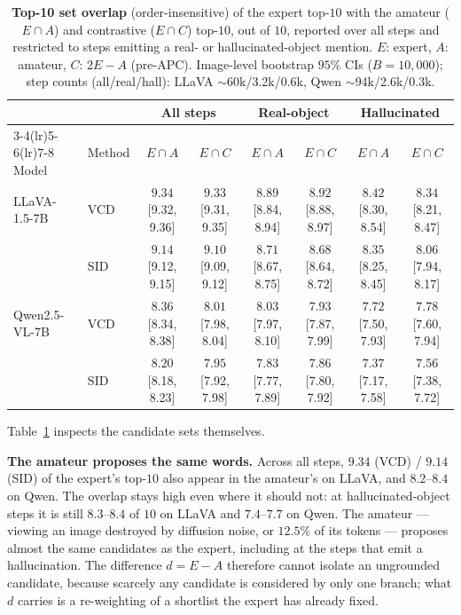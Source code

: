 \begin{table}[t]
\centering
\small
\setlength{\tabcolsep}{1.5pt}
\caption{\textbf{Top-10 set overlap} (order-insensitive) of the expert top-$10$
with the amateur ($E\!\cap\!A$) and contrastive ($E\!\cap\!C$) top-$10$, out of
$10$, reported over all steps and restricted to steps emitting a real- or
hallucinated-object mention. $E$: expert, $A$: amateur, $C$: $2E-A$ (pre-APC).
Image-level bootstrap $95\%$ CIs ($B=10{,}000$); step counts (all/real/hall):
LLaVA $\sim$60k/3.2k/0.6k, Qwen $\sim$94k/2.6k/0.3k.}
\label{tab:cdmech-overlap}
\begin{tabular}{llcccccc}
\toprule
& & \multicolumn{2}{c}{All steps} & \multicolumn{2}{c}{Real-object} & \multicolumn{2}{c}{Hallucinated} \\
\cmidrule(lr){3-4}\cmidrule(lr){5-6}\cmidrule(lr){7-8}
Model & Method & $E\!\cap\!A$ & $E\!\cap\!C$ & $E\!\cap\!A$ & $E\!\cap\!C$ & $E\!\cap\!A$ & $E\!\cap\!C$ \\
\midrule
LLaVA-1.5-7B
 & VCD & $9.34$ \tiny{[9.32, 9.36]} & $9.33$ \tiny{[9.31, 9.35]} & $8.89$ \tiny{[8.84, 8.94]} & $8.92$ \tiny{[8.88, 8.97]} & $8.42$ \tiny{[8.30, 8.54]} & $8.34$ \tiny{[8.21, 8.47]} \\
 & SID & $9.14$ \tiny{[9.12, 9.15]} & $9.10$ \tiny{[9.09, 9.12]} & $8.71$ \tiny{[8.67, 8.75]} & $8.68$ \tiny{[8.64, 8.72]} & $8.35$ \tiny{[8.25, 8.45]} & $8.06$ \tiny{[7.94, 8.17]} \\
\midrule
Qwen2.5-VL-7B
 & VCD & $8.36$ \tiny{[8.34, 8.38]} & $8.01$ \tiny{[7.98, 8.04]} & $8.03$ \tiny{[7.97, 8.10]} & $7.93$ \tiny{[7.87, 7.99]} & $7.72$ \tiny{[7.50, 7.93]} & $7.78$ \tiny{[7.60, 7.94]} \\
 & SID & $8.20$ \tiny{[8.18, 8.23]} & $7.95$ \tiny{[7.92, 7.98]} & $7.83$ \tiny{[7.77, 7.89]} & $7.86$ \tiny{[7.80, 7.92]} & $7.37$ \tiny{[7.17, 7.58]} & $7.56$ \tiny{[7.38, 7.72]} \\
\bottomrule
\end{tabular}
\end{table}

Table~\ref{tab:cdmech-overlap} inspects the candidate sets themselves.

\textbf{The amateur proposes the same words.} Across all steps, $9.34$ (VCD) /
$9.14$ (SID) of the expert's top-$10$ also appear in the amateur's on LLaVA, and
$8.2$--$8.4$ on Qwen. The overlap stays high even where it should not: at
hallucinated-object steps it is still $8.3$--$8.4$ of $10$ on LLaVA and
$7.4$--$7.7$ on Qwen. The amateur --- viewing an image destroyed by diffusion
noise, or $12.5\%$ of its tokens --- proposes almost the same candidates as the
expert, including at the steps that emit a hallucination. The difference
$d = E - A$ therefore cannot isolate an ungrounded candidate, because scarcely
any candidate is considered by only one branch; what $d$ carries is a
re-weighting of a shortlist the expert has already fixed.

